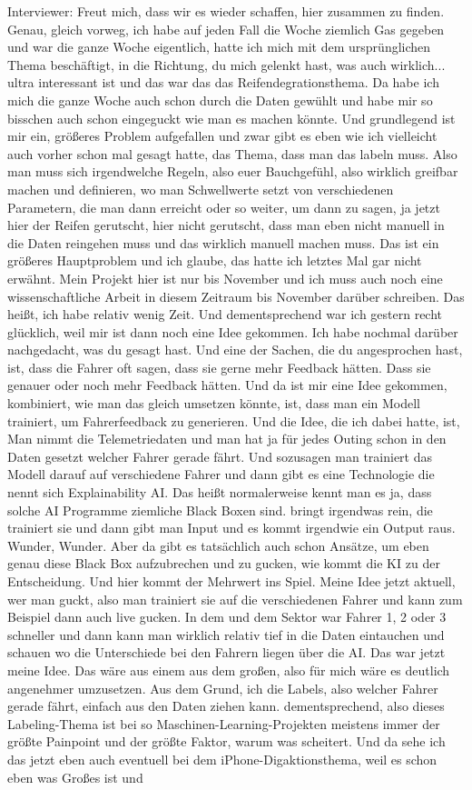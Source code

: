Interviewer:
Freut mich, dass wir es wieder schaffen, hier zusammen zu finden. Genau, gleich vorweg, ich habe auf jeden Fall die Woche ziemlich Gas gegeben und war die ganze Woche eigentlich, hatte ich mich mit dem ursprünglichen Thema beschäftigt, in die Richtung, du mich gelenkt hast, was auch wirklich...  ultra interessant ist und das war das das Reifendegrationsthema. Da habe ich mich die ganze Woche auch schon durch die Daten gewühlt und habe mir so bisschen auch schon eingeguckt wie man es machen könnte. Und grundlegend ist mir ein, größeres Problem aufgefallen und zwar gibt es  eben wie ich vielleicht auch vorher schon mal gesagt hatte, das Thema, dass man das labeln muss. Also man muss sich irgendwelche Regeln, also euer Bauchgefühl, also wirklich greifbar machen und definieren, wo man Schwellwerte setzt von verschiedenen Parametern, die man dann erreicht oder so weiter, um dann zu sagen, ja jetzt hier der Reifen gerutscht, hier nicht gerutscht, dass man eben nicht manuell in die Daten reingehen muss und das wirklich manuell machen muss. Das ist ein größeres Hauptproblem und ich glaube, das hatte ich letztes Mal gar nicht erwähnt. Mein Projekt hier ist nur bis November und ich muss auch noch eine wissenschaftliche Arbeit in diesem Zeitraum bis November darüber schreiben. Das heißt, ich habe relativ wenig Zeit. Und dementsprechend war ich gestern recht glücklich, weil mir ist dann noch eine Idee gekommen. Ich habe nochmal darüber nachgedacht, was du gesagt hast. Und eine der Sachen, die du angesprochen hast, ist, dass die Fahrer oft sagen, dass sie gerne mehr Feedback hätten. Dass sie genauer oder noch mehr Feedback hätten. Und da ist mir eine Idee gekommen,  kombiniert, wie man das gleich umsetzen könnte, ist, dass man ein  Modell trainiert, um Fahrerfeedback zu generieren. Und die Idee, die ich dabei hatte, ist,  Man nimmt die Telemetriedaten und man hat ja für jedes Outing  schon in den Daten gesetzt welcher Fahrer gerade fährt. Und sozusagen man trainiert  das Modell darauf auf verschiedene Fahrer und dann gibt es eine Technologie die nennt sich Explainability AI. Das heißt normalerweise kennt man es ja, dass solche AI Programme ziemliche Black Boxen sind.  bringt irgendwas rein, die trainiert sie und dann gibt man Input und es kommt irgendwie ein Output raus. Wunder, Wunder. Aber da gibt es tatsächlich auch schon Ansätze, um eben genau diese Black Box aufzubrechen und zu gucken, wie kommt die KI zu der Entscheidung. Und hier kommt der Mehrwert ins Spiel. Meine Idee jetzt aktuell, wer man guckt, also man trainiert sie auf die verschiedenen Fahrer und kann zum Beispiel dann auch live gucken.  In dem und dem Sektor war Fahrer 1, 2 oder 3 schneller und dann kann man  wirklich relativ tief in die Daten eintauchen und schauen  wo die Unterschiede bei den Fahrern liegen über die AI. Das war jetzt meine Idee. Das wäre aus einem aus  dem großen, also für mich wäre es deutlich angenehmer umzusetzen.  Aus dem Grund, ich die Labels, also welcher Fahrer gerade fährt, einfach aus den Daten ziehen kann. dementsprechend, also dieses Labeling-Thema ist bei so Maschinen-Learning-Projekten meistens immer der größte Painpoint und der größte Faktor, warum was scheitert. Und da sehe ich das jetzt eben auch eventuell bei dem iPhone-Digaktionsthema, weil es schon eben was Großes ist und 